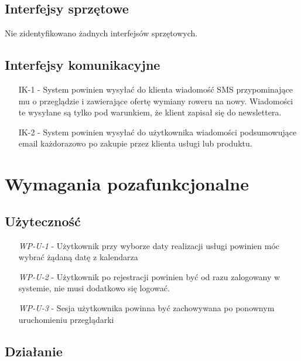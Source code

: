 \documentclass[a4paper,20pt]{article}
\begin{document}
\begin{itemize}
\end{itemize}


\subsection{Interfejsy sprzętowe}
Nie zidentyfikowano żadnych interfejsów sprzętowych.


\subsection{Interfejsy komunikacyjne}

\begin{itemize}
\item [IK-1] - System powinien wysyłać do klienta wiadomość SMS przypominające mu o przeglądzie i zawierające ofertę wymiany roweru na nowy. Wiadomości te wysyłane są tylko pod warunkiem, że klient zapisał się do newslettera.
\item [IK-2] - System powinien wysyłać do użytkownika wiadomości podsumowujące email każdorazowo po zakupie przez klienta usługi lub produktu. 
\end{itemize}



\newpage
\section{Wymagania pozafunkcjonalne}

\subsection{Użyteczność}

\begin{itemize}
\item [\textit{WP-U-1}] - Użytkownik przy wyborze daty realizacji usługi powinien móc wybrać żądaną datę z kalendarza \\
\item [\textit{WP-U-2}] - Użytkownik po rejestracji powinien być od razu zalogowany w systemie, nie musi dodatkowo się logować. \\
\item [\textit{WP-U-3}] - Sesja użytkownika powinna być zachowywana po ponownym uruchomieniu przeglądarki
\end{itemize}


\subsection{Działanie}
\end{document}
